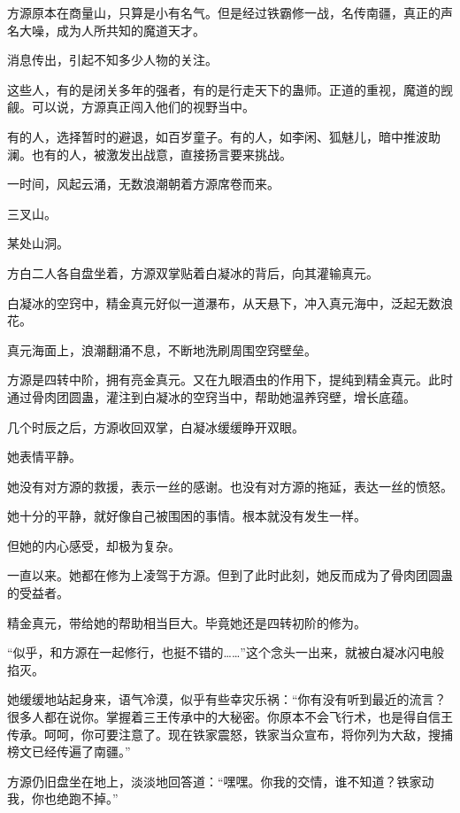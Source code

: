 
\begin{this_body}



方源原本在商量山，只算是小有名气。但是经过铁霸修一战，名传南疆，真正的声名大噪，成为人所共知的魔道天才。

消息传出，引起不知多少人物的关注。

这些人，有的是闭关多年的强者，有的是行走天下的蛊师。正道的重视，魔道的觊觎。可以说，方源真正闯入他们的视野当中。

有的人，选择暂时的避退，如百岁童子。有的人，如李闲、狐魅儿，暗中推波助澜。也有的人，被激发出战意，直接扬言要来挑战。

一时间，风起云涌，无数浪潮朝着方源席卷而来。

三叉山。

某处山洞。

方白二人各自盘坐着，方源双掌贴着白凝冰的背后，向其灌输真元。

白凝冰的空窍中，精金真元好似一道瀑布，从天悬下，冲入真元海中，泛起无数浪花。

真元海面上，浪潮翻涌不息，不断地洗刷周围空窍壁垒。

方源是四转中阶，拥有亮金真元。又在九眼酒虫的作用下，提纯到精金真元。此时通过骨肉团圆蛊，灌注到白凝冰的空窍当中，帮助她温养窍壁，增长底蕴。

几个时辰之后，方源收回双掌，白凝冰缓缓睁开双眼。

她表情平静。

她没有对方源的救援，表示一丝的感谢。也没有对方源的拖延，表达一丝的愤怒。

她十分的平静，就好像自己被围困的事情。根本就没有发生一样。

但她的内心感受，却极为复杂。

一直以来。她都在修为上凌驾于方源。但到了此时此刻，她反而成为了骨肉团圆蛊的受益者。

精金真元，带给她的帮助相当巨大。毕竟她还是四转初阶的修为。

“似乎，和方源在一起修行，也挺不错的……”这个念头一出来，就被白凝冰闪电般掐灭。

她缓缓地站起身来，语气冷漠，似乎有些幸灾乐祸：“你有没有听到最近的流言？很多人都在说你。掌握着三王传承中的大秘密。你原本不会飞行术，也是得自信王传承。呵呵，你可要注意了。现在铁家震怒，铁家当众宣布，将你列为大敌，搜捕榜文已经传遍了南疆。”

方源仍旧盘坐在地上，淡淡地回答道：“嘿嘿。你我的交情，谁不知道？铁家动我，你也绝跑不掉。”


\end{this_body}
